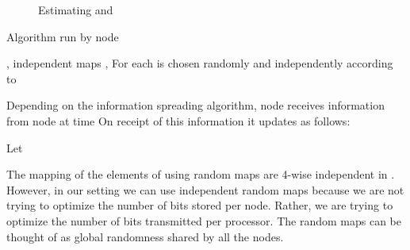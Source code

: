 \documentclass[10pt,twosided,a4paper,draft,onecolumn]{article}
\newcommand{\myunit}{1 cm}
\begin{document}
\begin{figure}[h]
\begin{center}
\end{center}
\caption{Estimating  and }
\label{fig:estimate}
\end{figure}


\begin{algorithm} 
  \caption{Algorithm run by node }{\label{alg:f2}}
  \begin{algorithmic}[1] 
    \REQUIRE , independent maps  
    \STATE ,  
    \STATE For each   is chosen randomly
    and independently according to 

\STATE Depending on the information spreading algorithm, node 
    receives information from node  at time  On
    receipt of this information it updates as follows:

\STATE Let  
    \STATE    
  \end{algorithmic}
\end{algorithm}


The mapping of the elements of  using random maps  are
4-wise independent in \cite{Alon96}. However, in our setting we can
use independent random maps because we are not trying to optimize the
number of bits stored per node. Rather, we are trying to optimize the
number of bits transmitted per processor. The random maps can be
thought of as global randomness shared by all the nodes.
\end{document}
